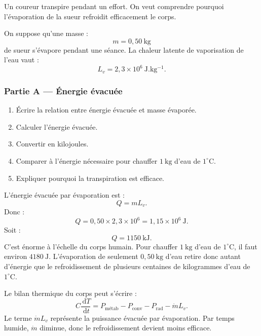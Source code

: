 \documentclass[11pt,a4paper]{article}
\newcommand{\dd}{\,\mathrm d}
\begin{document}
\begin{exercicebox}
Un coureur transpire pendant un effort. On veut comprendre pourquoi l'évaporation de la sueur refroidit efficacement le corps.

On suppose qu'une masse :
\[
m=0{,}50\ \mathrm{kg}
\]
de sueur s'évapore pendant une séance. La chaleur latente de vaporisation de l'eau vaut :
\[
L_v=2{,}3\times10^6\ \mathrm{J.kg^{-1}}.
\]
\end{exercicebox}

\subsubsection*{Partie A — Énergie évacuée}

\begin{enumerate}
  \item Écrire la relation entre énergie évacuée et masse évaporée.
  \item Calculer l'énergie évacuée.
  \item Convertir en kilojoules.
  \item Comparer à l'énergie nécessaire pour chauffer \(1\ \mathrm{kg}\) d'eau de \(1^\circ\mathrm C\).
  \item Expliquer pourquoi la transpiration est efficace.
\end{enumerate}

\begin{corrigebox}
L'énergie évacuée par évaporation est :
\[
Q=mL_v.
\]
Donc :
\[
Q=0{,}50\times2{,}3\times10^6
=
1{,}15\times10^6\ \mathrm J.
\]
Soit :
\[
Q=1150\ \mathrm{kJ}.
\]
C'est énorme à l'échelle du corps humain. Pour chauffer \(1\ \mathrm{kg}\) d'eau de \(1^\circ\mathrm C\), il faut environ \(4180\ \mathrm J\). L'évaporation de seulement \(0{,}50\ \mathrm{kg}\) d'eau retire donc autant d'énergie que le refroidissement de plusieurs centaines de kilogrammes d'eau de \(1^\circ\mathrm C\).
\end{corrigebox}

\begin{approfondissementbox}
Le bilan thermique du corps peut s'écrire :
\[
C\frac{\dd T}{\dd t}=P_{\mathrm{métab}}-P_{\mathrm{conv}}-P_{\mathrm{rad}}-\dot m L_v.
\]
Le terme \(\dot m L_v\) représente la puissance évacuée par évaporation. Par temps humide, \(\dot m\) diminue, donc le refroidissement devient moins efficace.
\end{approfondissementbox}

\end{document}
